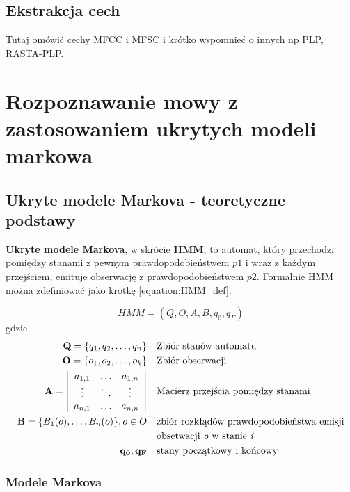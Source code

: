 \documentclass[11pt]{article}
\begin{document}
	\subsection{ Ekstrakcja cech }
	Tutaj omówić cechy MFCC i MFSC i krótko wspomnieć o innych np PLP, RASTA-PLP.
	

\section {Rozpoznawanie mowy z zastosowaniem ukrytych modeli markowa}
    \subsection{Ukryte modele Markova - teoretyczne podstawy}
    
	    \textbf{Ukryte modele Markova}, w skrócie \textbf{HMM}, to automat, który przechodzi pomiędzy stanami z pewnym prawdopodobieństwem $p1$ i wraz z każdym przejściem, emituje obserwację z prawdopodobieństwem $p2$. Formalnie HMM można zdefiniować jako krotkę \ref{equation:HMM_def}.
	    
	    \begin{equation}
		    HMM = (Q, O, A, B, q_0, q_F)
		    \label{equation:HMM_def}
	    \end{equation}
	    gdzie
	    \begin{align*}
		    \mathbf{Q}=\{q_1, q_2,\ldots,q_n\} & &&  \text{Zbiór stanów automatu} \\
	 	    \mathbf{O}=\{o_1, o_2,\ldots,o_k\} & &&  \text{Zbiór obserwacji} \\
	 	    \mathbf{A} =
	 	    \left| \begin{array}{ccc}
		 	    a_{1,1} & \ldots & a_{1,n} \\
		 	    \vdots  & \ddots & \vdots\\
		 	    a_{n,1} & \ldots & a_{n,n}
	 	    \end{array} \right|
	 	    & &&  \text{Macierz przejścia pomiędzy stanami} \\
	 	    \mathbf{B}=\{B_1(o),\ldots,B_n(o)\},o \in O & && \text{zbiór rozkłądów prawdopodobieństwa emisji} \\ 
													 	& && \text{obsetwacji \textit{o} w stanie \textit{i}} \\
		 	\mathbf{q_0, q_F}				  & && \text{stany początkowy i końcowy}
	    \end{align*}
	    
    	
	    	
	   \subsubsection{Modele Markova}
\end{document}
